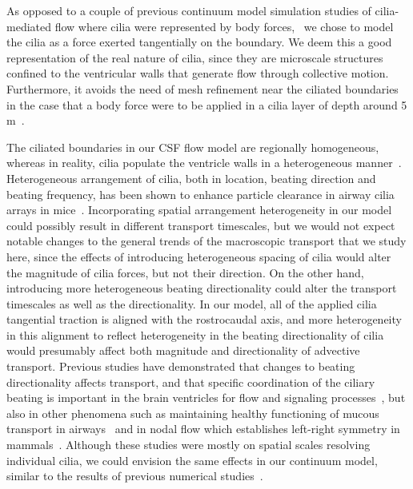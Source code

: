 \documentclass{WileyMSP-template}
\begin{document}
As opposed to a couple of previous continuum model simulation studies of
cilia-mediated flow where cilia were represented by body
forces,~\cite{Siyahhan2014FlowVentricles, Thouvenin2020OriginCanal}
we chose to model the cilia as a force
exerted tangentially on the boundary.
We deem this a good representation of the real nature of cilia,
since they are microscale structures confined to the ventricular walls that
generate flow through collective motion. Furthermore, it avoids the need of mesh
refinement near the ciliated boundaries in the case that a
body force were to be applied in a cilia layer of depth around
5 \textmu m~\cite{Salman2022ComputationalEmbryo}.

The ciliated boundaries in our CSF flow model are regionally homogeneous,
whereas in reality, cilia populate the ventricle walls in a
heterogeneous manner~\cite{Olstad2019CiliaryDevelopment}. Heterogeneous
arrangement of cilia, both in location, beating direction and beating frequency,
has been shown to enhance particle clearance in airway cilia arrays
in mice~\cite{Ramirez-SanJuan2020Multi-scaleArrays}.
Incorporating spatial arrangement heterogeneity in our model could possibly
result in different transport timescales,
but we would not expect notable changes to the general trends of the macroscopic
transport that we study here, since the effects of introducing heterogeneous spacing
of cilia would alter the magnitude of cilia forces, but not their direction.
On the other hand, introducing more heterogeneous beating directionality could
alter the transport timescales as well as the directionality.
In our model, all of the applied cilia
tangential traction is aligned with the rostrocaudal axis, and more heterogeneity
in this alignment to reflect heterogeneity in the beating directionality of
cilia would presumably affect both magnitude and directionality of advective transport.
Previous studies have demonstrated that changes to beating directionality affects transport,
and that specific coordination of the ciliary beating is important in the brain ventricles for
flow and signaling processes~\cite{Eichele2020Cilia-drivenVentricle, Olstad2019CiliaryDevelopment,
Faubel2016Cilia-basedVentricles, Guirao2010CouplingCilia, Afzelius2004Cilia-relatedDiseases},
but also in other phenomena such as maintaining healthy functioning of mucous transport in
airways~\cite{Rayner1996CiliarySyndrome, Schneiter2021Multi-scaleFunction,
Bustamante-Marin2019LackClearance, Tsukita2012CoordinatedFeet} and in nodal flow which establishes
left-right symmetry in mammals~\cite{Yoshiba2014RolesSymmetry, Hirokawa2006NodalAsymmetry,
Sawamoto2006NewBrain}.
Although these studies were mostly on spatial scales resolving individual cilia,
we could envision the same effects in our continuum model,
similar to the results of previous numerical studies~\cite{Ramirez-SanJuan2020Multi-scaleArrays,
Thouvenin2020OriginCanal, Yoshida2022EffectVentricles}. 
\end{document}
